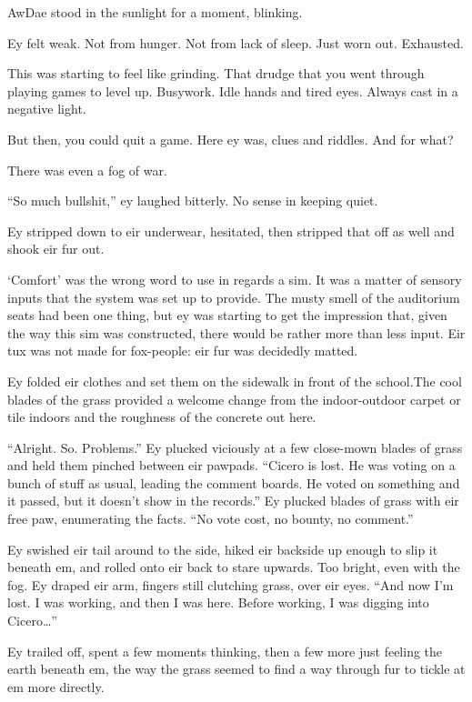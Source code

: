 AwDae stood in the sunlight for a moment, blinking.

Ey felt weak. Not from hunger. Not from lack of sleep. Just worn out. Exhausted.

This was starting to feel like grinding. That drudge that you went through playing games to level up. Busywork. Idle hands and tired eyes. Always cast in a negative light.

But then, you could quit a game. Here ey was, clues and riddles. And for what?

There was even a fog of war.

``So much bullshit,'' ey laughed bitterly. No sense in keeping quiet.

Ey stripped down to eir underwear, hesitated, then stripped that off as well and shook eir fur out.

`Comfort' was the wrong word to use in regards a sim. It was a matter of sensory inputs that the system was set up to provide. The musty smell of the auditorium seats had been one thing, but ey was starting to get the impression that, given the way this sim was constructed, there would be rather more than less input. Eir tux was not made for fox-people: eir fur was decidedly matted.

Ey folded eir clothes and set them on the sidewalk in front of the school.The cool blades of the grass provided a welcome change from the indoor-outdoor carpet or tile indoors and the roughness of the concrete out here.

``Alright. So. Problems.'' Ey plucked viciously at a few close-mown blades of grass and held them pinched between eir pawpads. ``Cicero is lost. He was voting on a bunch of stuff as usual, leading the comment boards. He voted on something and it passed, but it doesn't show in the records.'' Ey plucked blades of grass with eir free paw, enumerating the facts. ``No vote cost, no bounty, no comment.''

Ey swished eir tail around to the side, hiked eir backside up enough to slip it beneath em, and rolled onto eir back to stare upwards. Too bright, even with the fog. Ey draped eir arm, fingers still clutching grass, over eir eyes. ``And now I'm lost. I was working, and then I was here. Before working, I was digging into Cicero\ldots{}''

Ey trailed off, spent a few moments thinking, then a few more just feeling the earth beneath em, the way the grass seemed to find a way through fur to tickle at em more directly.


